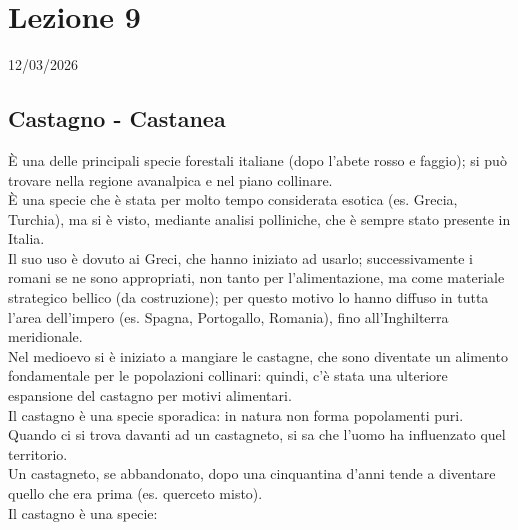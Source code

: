 \section{Lezione 9} \hfill 12/03/2026
\subsection{Castagno - Castanea}
È una delle principali specie forestali italiane (dopo l'abete rosso e faggio); si può trovare nella regione avanalpica e nel piano collinare.\\
È una specie che è stata per molto tempo considerata esotica (es. Grecia, Turchia), ma si è visto, mediante analisi polliniche, che è sempre stato presente in Italia.\\
Il suo uso è dovuto ai Greci, che hanno iniziato ad usarlo; successivamente i romani se ne sono appropriati, non tanto per l'alimentazione, ma come materiale strategico bellico (da costruzione); per questo motivo lo hanno diffuso in tutta l'area dell'impero (es. Spagna, Portogallo, Romania), fino all'Inghilterra meridionale.\\
Nel medioevo si è iniziato a mangiare le castagne, che sono diventate un alimento fondamentale per le popolazioni collinari: quindi, c'è stata una ulteriore espansione del castagno per motivi alimentari.\\
Il castagno è una specie sporadica: in natura non forma popolamenti puri. Quando ci si trova davanti ad un castagneto, si sa che l'uomo ha influenzato quel territorio.\\
Un castagneto, se abbandonato, dopo una cinquantina d'anni tende a diventare quello che era prima (es. querceto misto).\\
Il castagno è una specie:
